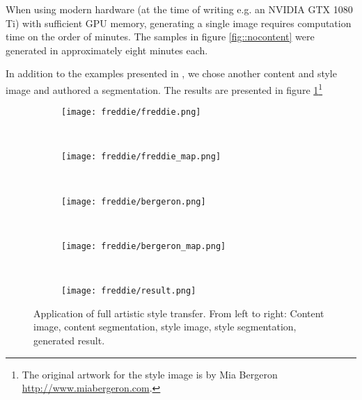 When using modern hardware (at the time of writing e.g. an NVIDIA GTX 1080 Ti) with sufficient GPU memory, generating a single image requires computation time on the order of minutes. The samples in figure \ref{fig::nocontent} were generated in approximately eight minutes each. 

In addition to the examples presented in \cite{doodles2016}, we chose another content and style image and authored a segmentation. The results are presented in figure \ref{fig::freddie}\footnote{The original artwork for the style image is by Mia Bergeron \url{http://www.miabergeron.com}.}

\begin{figure}
	\begin{subfigure}[t]{0.18\textwidth}
		\centering
		\texttt{[image: freddie/freddie.png]}
	\end{subfigure}%
	~
	\begin{subfigure}[t]{0.18\textwidth}
		\centering
		\texttt{[image: freddie/freddie\_map.png]}
	\end{subfigure}%
	~
	\begin{subfigure}[t]{0.18\textwidth}
		\centering
		\texttt{[image: freddie/bergeron.png]}
	\end{subfigure}
	~
	\begin{subfigure}[t]{0.18\textwidth}
		\centering
		\texttt{[image: freddie/bergeron\_map.png]}
	\end{subfigure}
	~
	\begin{subfigure}[t]{0.18\textwidth}
		\centering
		\texttt{[image: freddie/result.png]}
	\end{subfigure}
	
	\caption[]{Application of full artistic style transfer. From left to right: Content image, content segmentation, style image, style segmentation, generated result.}
	\label{fig::freddie}
\end{figure}
